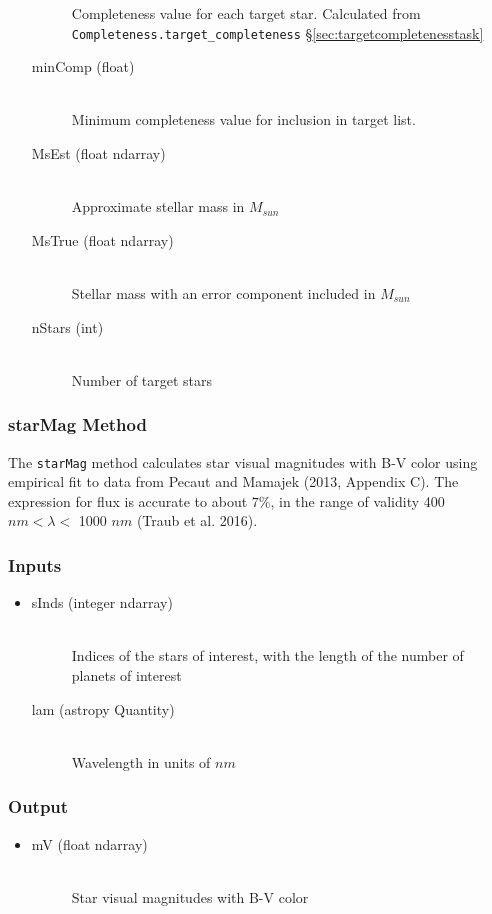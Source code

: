 \documentclass[cleanfoot]{asme2ej}
\begin{document}
\begin{itemize}
\begin{description}
        Completeness value for each target star. Calculated from \verb+Completeness.target_completeness+ \S\ref{sec:targetcompletenesstask}
        \item[minComp (float)] \hfill \\
        Minimum completeness value for inclusion in target list. 
        \item[MsEst (float ndarray)] \hfill \\
        Approximate stellar mass in $ M_{sun} $
        \item[MsTrue (float ndarray)] \hfill \\
        Stellar mass with an error component included in $ M_{sun} $
        \item[nStars (int)] \hfill \\
        Number of target stars
    \end{description}
\end{itemize}

\subsubsection{starMag Method} \label{sec:starMagtask}
The \verb+starMag+ method calculates star visual magnitudes with B-V color using empirical fit to data from Pecaut and Mamajek (2013, Appendix C). The expression for flux is accurate to about $7\%$, in the range of validity 400 $ nm < \lambda < $ 1000 $ nm $ (Traub et al. 2016).
\subsubsection*{Inputs}
\begin{itemize}
    \item 
    \begin{description}
        \item[sInds (integer ndarray)] \hfill \\
        Indices of the stars of interest, with the length of the number 
        of planets of interest
        \item[lam (astropy Quantity)] \hfill \\
        Wavelength in units of $ nm $
    \end{description}
\end{itemize}
\subsubsection*{Output}
\begin{itemize}
    \item
    \begin{description}
        \item[mV (float ndarray)] \hfill \\
        Star visual magnitudes with B-V color
    \end{description}
\end{itemize}
\end{document}
